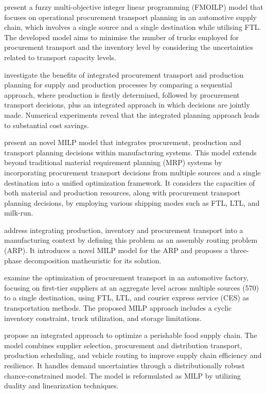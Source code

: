 \autocite{Diaz-Madronero2014APlanning} present a  fuzzy  multi-objective  integer  linear programming (FMOILP) model that focuses on operational procurement transport planning in an automotive supply chain, which involves a single source and a single destination while utilising FTL. The developed model aims to minimise the number of trucks employed for procurement transport and the inventory level by considering the uncertainties related to transport capacity levels.

\autocite{Hein2016QuantitativeProblem} investigate the benefits of integrated procurement transport and production planning for supply and production processes by comparing a sequential approach, where production is firstly determined, followed by procurement transport decisions, plus an integrated approach in which decisions are jointly made. Numerical experiments reveal that the integrated planning approach leads to substantial cost savings.

\autocite{Diaz-Madronero2017ADecisions} present an novel MILP model that integrates  procurement, production and transport planning decisions within manufacturing systems. This model extends beyond traditional material requirement planning (MRP) systems by incorporating procurement transport decisions from multiple sources and a single destination into a unified optimization framework. It considers the capacities of both material and production resources, along with procurement transport planning decisions, by employing various shipping modes such as FTL, LTL, and milk-run.

\autocite{Chitsaz2019ARouting} address integrating production, inventory and procurement transport into a manufacturing context by defining this problem as an assembly routing problem (ARP). It introduces a novel MILP model for the ARP and proposes a three-phase decomposition matheuristic for its solution.

\autocite{Baller2022OptimizingApproach} examine the optimization of procurement transport in an automotive factory, focusing on first-tier suppliers at an aggregate level across multiple sources (570) to a single destination, using FTL, LTL, and courier express service (CES) as transportation methods. The proposed MILP approach includes a cyclic inventory constraint, truck utilization, and storage limitations.

\autocite{Hashemi-Amiri2023IntegratedApproach} propose an integrated approach to optimize a perishable food supply chain. The model combines supplier selection, procurement and distribution transport, production scheduling, and vehicle routing to improve supply chain efficiency and resilience. It handles demand uncertainties through a distributionally robust chance-constrained model. The model is reformulated as MILP by utilizing duality and linearization techniques.


